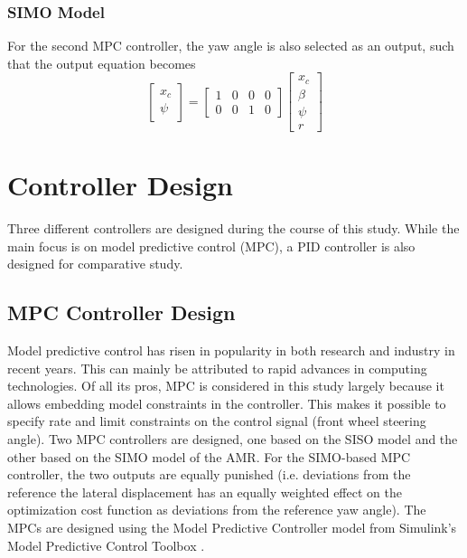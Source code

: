 \documentclass[a4paper, twocolumn]{article}
\begin{document}
\subsubsection{SIMO Model}
For the second MPC controller, the yaw angle is also selected as an output, 
such that the output equation becomes
\footnotesize
$$ 
\begin{bmatrix}
    x_{c} 
    \\
    \psi   
\end{bmatrix}=
\begin{bmatrix}
    1&0&0&0
    \\
    0&0&1&0
\end{bmatrix}
\begin{bmatrix}
    x_{c}
    \\
    \beta
    \\
    \psi
    \\  
    r
\end{bmatrix}
$$

\normalsize


\section{Controller Design}
Three different controllers are designed during the course of this study. 
While the main focus is on model predictive control (MPC), a PID controller is also designed for comparative study. 

\subsection{MPC Controller Design}
Model predictive control has risen in popularity in both research and industry in recent years. 
This can mainly be attributed to rapid advances in computing technologies. 
Of all its pros, MPC is considered in this study largely because it allows embedding model constraints in the controller. 
This makes it possible to specify rate and limit constraints on the control signal (front wheel steering angle). 
Two MPC controllers are designed, one based on the SISO model and the other based on the SIMO model of the AMR. 
For the SIMO-based MPC controller, the two outputs are equally punished  
(i.e. deviations from the reference the lateral displacement has an equally weighted effect on the optimization cost function as deviations from the reference yaw angle). 
The MPCs are designed using the Model Predictive Controller model from Simulink's Model Predictive Control Toolbox \cite{mathworks1}. \\
\end{document}
